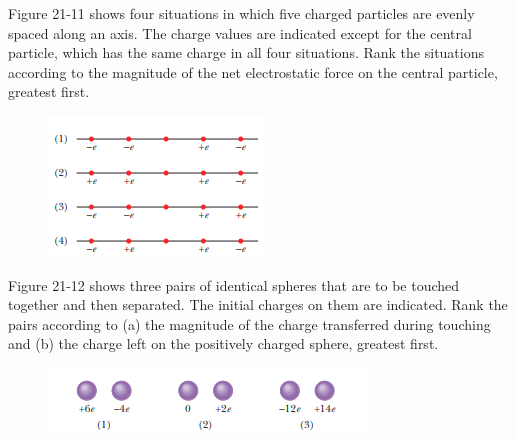 \documentclass[11pt]{exam}
\begin{document}
\newpage 


\begin{questions}





\addpoints
\question[10] Figure 21-11 shows four situations in which five charged particles are evenly spaced along an axis. The charge values are indicated except for the central particle, which has the same charge in all four situations. Rank the situations according to the magnitude of the net electrostatic force on the central particle, greatest first.\begin{figure}[H]
\centering
\includegraphics[scale=0.8]{assets/Halliday_ch21q1.png}
\end{figure}
\newpage

\addpoints
\question[10] Figure 21-12 shows three pairs of identical spheres that are to be touched together and then separated. The initial charges on them are indicated. Rank the pairs according to (a) the magnitude of the charge transferred during touching and (b)  the charge left on the positively charged sphere, greatest first.\begin{figure}[H]
\centering
\includegraphics[scale=0.8]{assets/Halliday_ch21q2.png}
\end{figure}
\newpage


\end{questions}
\end{document}
